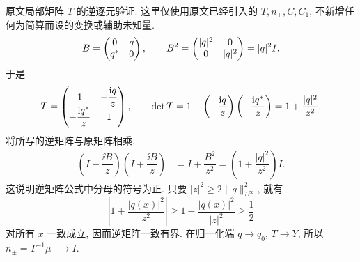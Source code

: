 \par\smallskip\noindent 原文局部矩阵 $ T$ 的逆逐元验证.\quad
这里仅使用原文已经引入的 $ T,n_\pm, C, C_1$,
不新增任何为简算而设的变换或辅助未知量.
\begin{equation*}
B=\begin{pmatrix}0&q\\{q}^{*}&0\end{pmatrix},
\qquad
B^2=\begin{pmatrix}|q|^2&0\\0&|q|^2\end{pmatrix}=|q|^2I.
\end{equation*}
于是
\begin{equation*}
 T=\begin{pmatrix}
1&-\dfrac{\mathrm{i} q}{z}\\-\dfrac{\mathrm{i}{q}^{*}}{z}&1
\end{pmatrix},
\qquad
\det T
=1-\left(-\dfrac{\mathrm{i} q}{z}\right)
\left(-\dfrac{\mathrm{i}{q}^{*}}{z}\right)
=1+\dfrac{|q|^2}{z^2}.
\end{equation*}
将所写的逆矩阵与原矩阵相乘,
\begin{align*}
\left(I-\dfrac{\ii B}{z}\right)
\left(I+\dfrac{\ii B}{z}\right)
&=I+\dfrac{B^2}{z^2}
=\left(1+\dfrac{|q|^2}{z^2}\right)I.
\end{align*}
这说明逆矩阵公式中分母的符号为正.
只要 $|z|^2\ge2\|q\|_{L^\infty}^2$, 就有
\begin{equation*}
\left|1+\dfrac{|q(x)|^2}{z^2}\right|
\ge1-\dfrac{|q(x)|^2}{|z|^2}\ge\dfrac{1}{2}
\end{equation*}
对所有 $x$ 一致成立, 因而逆矩阵一致有界.
在归一化端 $q\to q_0$, $ T\to Y$,
所以 $n_\pm= T^{-1}\mu_\pm\to I$.

